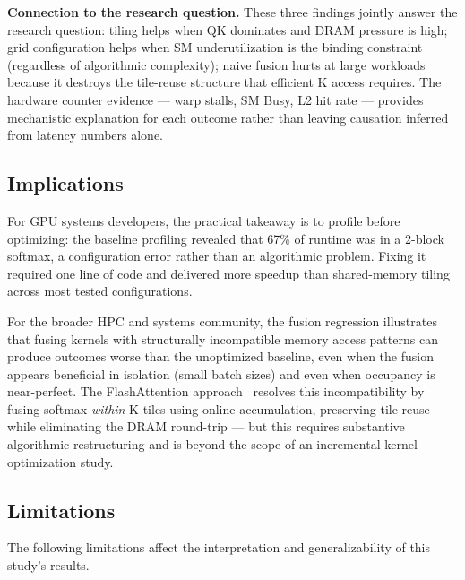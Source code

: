 \documentclass{article}
\begin{document}
\textbf{Connection to the research question.}
These three findings jointly answer the research question: tiling helps when
QK dominates and DRAM pressure is high; grid configuration helps when SM
underutilization is the binding constraint (regardless of algorithmic
complexity); naive fusion hurts at large workloads because it destroys the
tile-reuse structure that efficient K access requires. The hardware counter
evidence — warp stalls, SM Busy, L2 hit rate — provides mechanistic
explanation for each outcome rather than leaving causation inferred from
latency numbers alone.

\subsection{Implications}

For GPU systems developers, the practical takeaway is to profile before
optimizing: the baseline profiling revealed that 67\% of runtime was in a
2-block softmax, a configuration error rather than an algorithmic problem.
Fixing it required one line of code and delivered more speedup than
shared-memory tiling across most tested configurations.

For the broader HPC and systems community, the fusion regression illustrates
that fusing kernels with structurally incompatible memory access patterns
can produce outcomes worse than the unoptimized baseline, even when the
fusion appears beneficial in isolation (small batch sizes) and even when
occupancy is near-perfect. The FlashAttention
approach~\cite{dao2022flashattention} resolves this incompatibility by
fusing softmax \textit{within} K tiles using online accumulation, preserving
tile reuse while eliminating the DRAM round-trip — but this requires
substantive algorithmic restructuring and is beyond the scope of an
incremental kernel optimization study.

\subsection{Limitations}

The following limitations affect the interpretation and generalizability
of this study's results.
\end{document}
